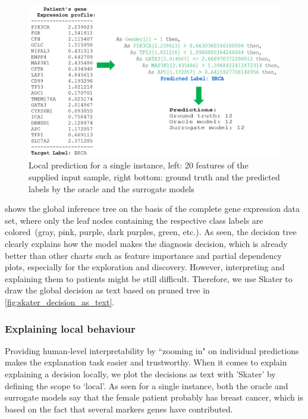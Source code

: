 \begin{figure}[h]
	\centering
		\includegraphics[scale=0.9]{images/single_pred_feature.png}
	    \caption[Local prediction for a single instance.]{Local prediction for a single instance, left: 20 features of the supplied input sample, right bottom: ground truth and the predicted labels by the oracle and the surrogate models}
	    \label{fig:decision_as_text_local_1}
\end{figure}

\hspace*{3.5mm}  shows the global inference tree on the basis of the complete gene expression data set, where only the leaf nodes containing the respective class labels are colored~(gray, pink, purple, dark purples, green, etc.). As seen, the decision tree clearly explains how the model makes the diagnosis decision, which is already better than other charts such as feature importance and partial dependency plots, especially for the exploration and discovery. However, interpreting and explaining them to patients might be still difficult. Therefore, we use Skater to draw the global decision as text based on pruned tree in \cref{fig:skater_decision_as_text}. %

\subsubsection{Explaining local behaviour}
Providing human-level interpretability by ``zooming in" on individual predictions makes the explanation task easier and trustworthy\cite{ribeiro2018anchors}. When it comes to explain explaining a decision locally, we plot the decisions as text with 'Skater' by defining the scope to `local'. As seen for a single instance, both the oracle and surrogate models say that the female patient probably has breast cancer, which is based on the fact that several markers genes have contributed. 

